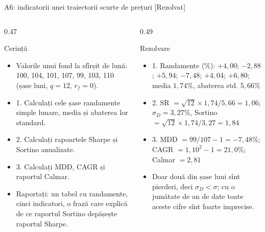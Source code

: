 \begin{frame}{A6: indicatorii unei traiectorii scurte de prețuri [Rezolvat]}
\itemsize{\footnotesize}
\begin{columns}[T]
\begin{column}{0.47\textwidth}
\begin{block}{Cerință}
\begin{itemize}
    \item Valorile unui fond la sfîrșit de lună: 100, 104, 101, 107, 99, 103, 110 (șase luni, $q = 12$, $r_f = 0$).
    \item 1. Calculați cele șase randamente simple lunare, media și abaterea lor standard.
    \item 2. Calculați rapoartele Sharpe și Sortino anualizate.
    \item 3. Calculați MDD, CAGR și raportul Calmar.
    \item Raportați: un tabel cu randamente, cinci indicatori, o frază care explică de ce raportul Sortino depășește raportul Sharpe.
\end{itemize}
\end{block}
\end{column}
\begin{column}{0.49\textwidth}
\begin{exampleblock}{Rezolvare}
\begin{itemize}
    \item 1. Randamente (\%): $+4{,}00$; $-2{,}88$; $+5{,}94$; $-7{,}48$; $+4{,}04$; $+6{,}80$; media $1{,}74\%$, abaterea std. $5{,}66\%$
    \item 2. SR $= \sqrt{12} \times 1{,}74/5{,}66 = 1{,}06$; $\sigma_D = 3{,}27\%$, Sortino $= \sqrt{12} \times 1{,}74/3{,}27 = 1{,}84$
    \item 3. MDD $= 99/107 - 1 = -7{,}48\%$; CAGR $= 1{,}10^{2} - 1 = 21{,}0\%$; Calmar $= 2{,}81$
    \item Doar două din șase luni sînt pierderi, deci $\sigma_D < \sigma$; cu o jumătate de an de date toate aceste cifre sînt foarte imprecise.
\end{itemize}
\end{exampleblock}
\end{column}
\end{columns}
\end{frame}

